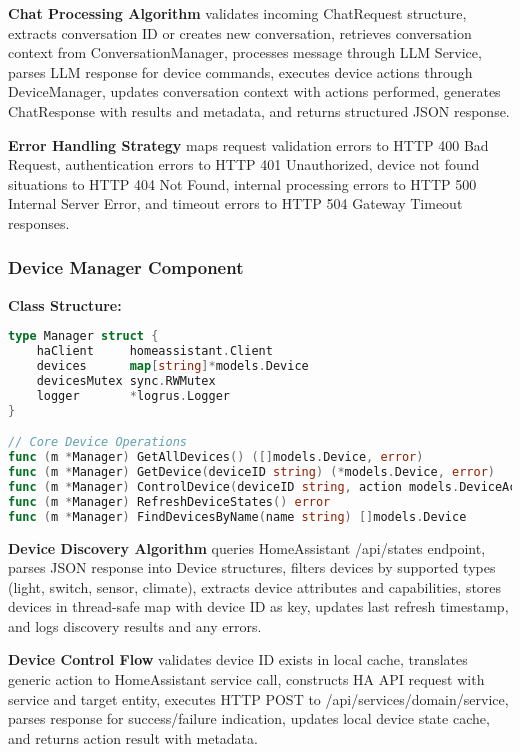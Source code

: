 \documentclass[12pt]{article}
\begin{document}
\textbf{Chat Processing Algorithm} validates incoming ChatRequest structure, extracts conversation ID or creates new conversation, retrieves conversation context from ConversationManager, processes message through LLM Service, parses LLM response for device commands, executes device actions through DeviceManager, updates conversation context with actions performed, generates ChatResponse with results and metadata, and returns structured JSON response.

\textbf{Error Handling Strategy} maps request validation errors to HTTP 400 Bad Request, authentication errors to HTTP 401 Unauthorized, device not found situations to HTTP 404 Not Found, internal processing errors to HTTP 500 Internal Server Error, and timeout errors to HTTP 504 Gateway Timeout responses.

\subsubsection{Device Manager Component}

\textbf{Class Structure:}
\begin{lstlisting}[language=Go, caption=Device Manager Structure]
type Manager struct {
    haClient     homeassistant.Client
    devices      map[string]*models.Device
    devicesMutex sync.RWMutex
    logger       *logrus.Logger
}

// Core Device Operations
func (m *Manager) GetAllDevices() ([]models.Device, error)
func (m *Manager) GetDevice(deviceID string) (*models.Device, error)
func (m *Manager) ControlDevice(deviceID string, action models.DeviceAction) error
func (m *Manager) RefreshDeviceStates() error
func (m *Manager) FindDevicesByName(name string) []models.Device
\end{lstlisting}

\textbf{Device Discovery Algorithm} queries HomeAssistant /api/states endpoint, parses JSON response into Device structures, filters devices by supported types (light, switch, sensor, climate), extracts device attributes and capabilities, stores devices in thread-safe map with device ID as key, updates last refresh timestamp, and logs discovery results and any errors.

\textbf{Device Control Flow} validates device ID exists in local cache, translates generic action to HomeAssistant service call, constructs HA API request with service and target entity, executes HTTP POST to /api/services/{domain}/{service}, parses response for success/failure indication, updates local device state cache, and returns action result with metadata.
\end{document}
